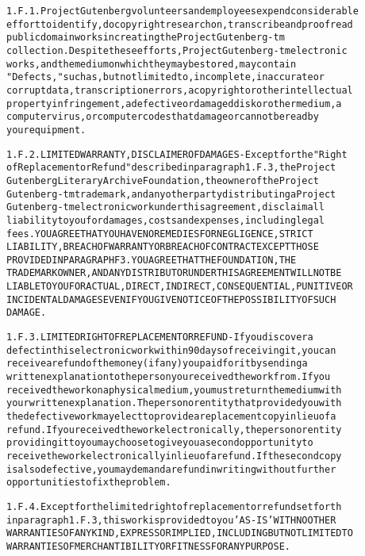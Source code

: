 \documentclass[12pt,leqno]{book}[2005/09/16]
\newenvironment{PGtext}{%
\begin{alltt}
\fontsize{9.2}{10.5}\ttfamily\selectfont}%
{\end{alltt}}
\begin{document}
\begin{PGtext}
1.F.1.  Project Gutenberg volunteers and employees expend considerable
effort to identify, do copyright research on, transcribe and proofread
public domain works in creating the Project Gutenberg-tm
collection.  Despite these efforts, Project Gutenberg-tm electronic
works, and the medium on which they may be stored, may contain
"Defects," such as, but not limited to, incomplete, inaccurate or
corrupt data, transcription errors, a copyright or other intellectual
property infringement, a defective or damaged disk or other medium, a
computer virus, or computer codes that damage or cannot be read by
your equipment.

1.F.2.  LIMITED WARRANTY, DISCLAIMER OF DAMAGES - Except for the "Right
of Replacement or Refund" described in paragraph 1.F.3, the Project
Gutenberg Literary Archive Foundation, the owner of the Project
Gutenberg-tm trademark, and any other party distributing a Project
Gutenberg-tm electronic work under this agreement, disclaim all
liability to you for damages, costs and expenses, including legal
fees.  YOU AGREE THAT YOU HAVE NO REMEDIES FOR NEGLIGENCE, STRICT
LIABILITY, BREACH OF WARRANTY OR BREACH OF CONTRACT EXCEPT THOSE
PROVIDED IN PARAGRAPH F3.  YOU AGREE THAT THE FOUNDATION, THE
TRADEMARK OWNER, AND ANY DISTRIBUTOR UNDER THIS AGREEMENT WILL NOT BE
LIABLE TO YOU FOR ACTUAL, DIRECT, INDIRECT, CONSEQUENTIAL, PUNITIVE OR
INCIDENTAL DAMAGES EVEN IF YOU GIVE NOTICE OF THE POSSIBILITY OF SUCH
DAMAGE.

1.F.3.  LIMITED RIGHT OF REPLACEMENT OR REFUND - If you discover a
defect in this electronic work within 90 days of receiving it, you can
receive a refund of the money (if any) you paid for it by sending a
written explanation to the person you received the work from.  If you
received the work on a physical medium, you must return the medium with
your written explanation.  The person or entity that provided you with
the defective work may elect to provide a replacement copy in lieu of a
refund.  If you received the work electronically, the person or entity
providing it to you may choose to give you a second opportunity to
receive the work electronically in lieu of a refund.  If the second copy
is also defective, you may demand a refund in writing without further
opportunities to fix the problem.

1.F.4.  Except for the limited right of replacement or refund set forth
in paragraph 1.F.3, this work is provided to you 'AS-IS' WITH NO OTHER
WARRANTIES OF ANY KIND, EXPRESS OR IMPLIED, INCLUDING BUT NOT LIMITED TO
WARRANTIES OF MERCHANTIBILITY OR FITNESS FOR ANY PURPOSE.


\end{PGtext}
\end{document}

